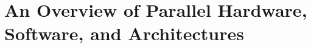 \section{An Overview of Parallel Hardware, Software, and Architectures}
\makesubcontentsslides






